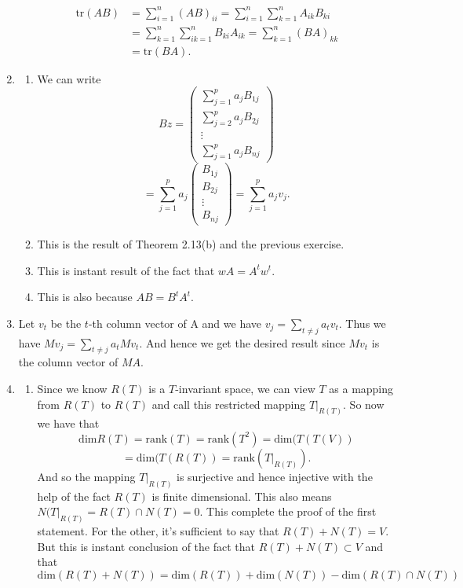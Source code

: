 \begin{enumerate}
\begin{align*}
\mathrm{tr}(AB)&=\sum_{i=1}^n{(AB)_{ii}}=\sum_{i=1}^n{\sum_{k=1}^n{A_{ik}B_{ki}}}\\
&=\sum_{k=1}^n{\sum_{ik=1}^n{B_{ki}A_{ik}}}=\sum_{k=1}^n{(BA)_{kk}}\\
&=\mathrm{tr}(BA).
\end{align*}
\item \begin{enumerate}
\item We can write 
\[Bz=\left(\begin{array}{c}\sum_{j=1}^p{a_jB_{1j}}\\\sum_{j=2}^p{a_jB_{2j}}\\ \vdots \\\sum_{j=1}^p{a_jB_{nj}}\end{array}\right)\]
\[=\sum_{j=1}^p{a_j\left(\begin{array}{c}B_{1j}\\B_{2j}\\ \vdots \\B_{nj}\end{array}\right)}=\sum_{j=1}^p{a_jv_j}.\]
\item This is the result of Theorem 2.13(b) and the previous exercise.
\item This is instant result of the fact that $wA=A^tw^t$.
\item This is also because $AB=B^tA^t$.
\end{enumerate}
\item Let $v_t$ be the $t$-th column vector of A and we have $v_j=\sum_{t\neq j}{a_tv_t}$. Thus we have $Mv_j=\sum_{t\neq j}{a_tMv_t}$. And hence we get the desired result since $Mv_t$ is the column vector of $MA$.
\item \begin{enumerate}
\item Since we know $R(T)$ is a $T$-invariant space, we can view $T$ as a mapping from $R(T)$ to $R(T)$ and call this restricted mapping $T|_{R(T)}$. So now we have that 
\[\mathrm{dim}R(T)=\mathrm{rank}(T)=\mathrm{rank}(T^2)=\mathrm{dim}(T(T(V))\]
\[=\mathrm{dim}(T(R(T))=\mathrm{rank}(T|_{R(T)}).\]
 And so the mapping $T|_{R(T)}$ is surjective and hence injective with the help of the fact $R(T)$ is finite dimensional. This also means $N(T|_{R(T)}=R(T)\cap N(T)={0}$. This complete the proof of the first statement. For the other, it's sufficient to say that $R(T)+N(T)=V$. But this is instant conclusion of the fact that $R(T)+N(T)\subset V$ and that 
\[\mathrm{dim}(R(T)+N(T))=\mathrm{dim}(R(T))+\mathrm{dim}(N(T))-\mathrm{dim}(R(T)\cap N(T))\]

\end{enumerate}
\end{enumerate}

